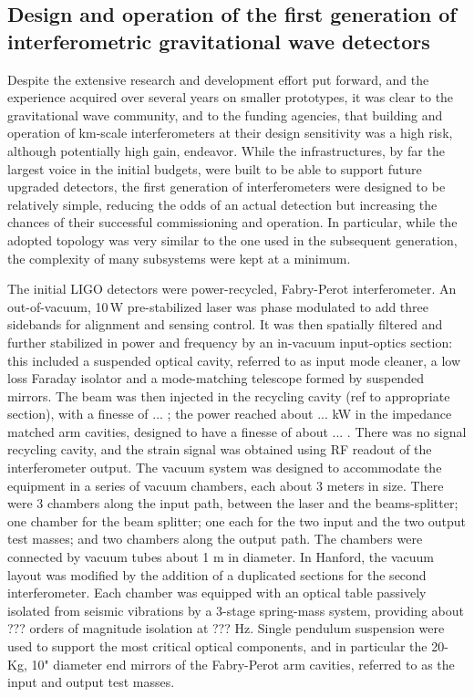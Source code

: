 \subsection{Design and operation of the first generation of interferometric gravitational wave detectors}\label{subsec:1stgen}

Despite the extensive research and development effort put forward, and the experience acquired over several years on smaller prototypes, it was clear to the gravitational wave community, and to the funding agencies, that building and operation of km-scale interferometers at their design sensitivity was a high risk, although potentially high gain, endeavor. While the infrastructures, by far the largest voice in the initial budgets, were built to be able to support future upgraded detectors, the first generation of interferometers were designed to be relatively simple, reducing the odds of an actual detection but increasing the chances of their successful commissioning and operation. In particular, while the adopted topology was very similar to the one used in the subsequent generation, the complexity of many subsystems were kept at a minimum.

The initial LIGO detectors were power-recycled, Fabry-Perot interferometer. An out-of-vacuum, 10\,W pre-stabilized laser was phase modulated to add three sidebands for alignment and sensing control. It was then spatially filtered and further stabilized in power and frequency by an in-vacuum input-optics section: this included a suspended optical cavity, referred to as input mode cleaner, a low loss Faraday isolator and a mode-matching telescope formed by suspended mirrors. The beam was then injected in the recycling cavity (ref to appropriate section), with a finesse of ... ; the power reached about ... kW in the impedance matched arm cavities, designed to have a finesse of about ... . There was no signal recycling cavity, and the strain signal was obtained using RF readout of the interferometer output.
The vacuum system was designed to accommodate the equipment in a series of vacuum chambers, each about 3 meters in size. There were 3 chambers along the input path, between the laser and the beams-splitter; one chamber for the beam splitter; one each for the two input and the two output test masses; and two chambers along the output path. The chambers were connected by vacuum tubes about 1 m in diameter. In Hanford, the vacuum layout was modified by the addition of a duplicated sections for the second interferometer.
Each chamber was equipped with an optical table passively isolated from seismic vibrations by a 3-stage spring-mass system, providing about ??? orders of magnitude isolation at ??? Hz. Single pendulum suspension were used to support the most critical optical components, and in particular the 20-Kg, 10" diameter end mirrors of the Fabry-Perot arm cavities, referred to as the input and output test masses.

